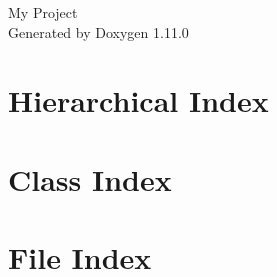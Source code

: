 \documentclass[twoside]{book}
\newcommand{\+}{\discretionary{\mbox{\scriptsize$\hookleftarrow$}}{}{}}
\newcommand{\clearemptydoublepage}{%
    \newpage{\pagestyle{empty}\cleardoublepage}%
  }
\begin{document}
  \raggedbottom
    \hypersetup{pageanchor=false,
                bookmarksnumbered=true,
                pdfencoding=unicode
               }
  \begin{titlepage}
  \vspace*{7cm}
  \begin{center}%
  {\Large My Project}\\
  \vspace*{1cm}
  {\large Generated by Doxygen 1.11.0}\\
  \end{center}
  \end{titlepage}
  \clearemptydoublepage
  \tableofcontents
  \clearemptydoublepage
  \hypersetup{pageanchor=true}
\chapter{Hierarchical Index}

\chapter{Class Index}

\chapter{File Index}

\end{document}
